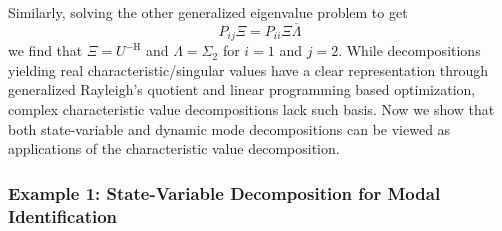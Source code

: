 \documentclass[10pt]{article}
\begin{document}
Similarly, solving the other generalized eigenvalue problem to get
\begin{equation}\label{Pijeq}
	P_{ij} \Xi = P_{ii} \Xi\overline{\Lambda}                                                                                                                                                                   
\end{equation}
we find that $\Xi = U^{-\mathrm{H}}$ and $\Lambda = \Sigma_2$ for $i=1$ and $j=2$.
While decompositions yielding real characteristic/singular values have a clear representation through generalized Rayleigh's quotient and linear programming based optimization, complex characteristic value decompositions lack such basis.
Now we show that both state-variable and dynamic mode decompositions can be viewed as applications of the characteristic value decomposition.

\subsubsection{Example 1: State-Variable Decomposition for Modal Identification}
\end{document}
